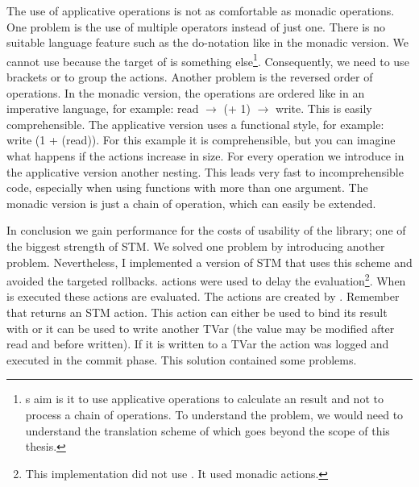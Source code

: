 The use of applicative operations is not as comfortable as monadic operations. One problem is the use of 
multiple operators instead of just one. There is no suitable language feature such as the do-notation like 
in the monadic version. We cannot use  because the target
of  is something else\footnote{s aim is it to use applicative 
operations to calculate an result and not to process a chain of operations. To understand the problem,
we would need to understand the translation scheme of  which goes beyond the scope of
this thesis.}. Consequently, we need to use brackets or \code{\$} to group the actions. Another problem is  
the reversed order of operations. In the monadic version, the operations are ordered like in an imperative
language, for example: read $\rightarrow$ (+ 1) $\rightarrow$ write. This is easily comprehensible. The 
applicative version uses a functional style, for example: write (1 + (read)). For this example it is 
comprehensible, but you can imagine what happens if the actions increase in size. For every operation
we introduce in the applicative version another nesting. This leads very fast to incomprehensible code,
especially when using functions with more than one argument. The monadic version is just a chain of operation, 
which can easily be extended. 

In conclusion we gain performance for the costs of usability of the library; one of the biggest strength of
STM. We solved one problem by introducing another problem. Nevertheless, I implemented a version of STM
that uses this scheme and avoided the targeted rollbacks.  actions were used
to delay the evaluation\footnote{This implementation did not use . It used monadic  actions.}. 
When \code{>>=} is executed these  actions are evaluated. The  actions are created by .
Remember that  returns an STM action. This action can either be used to bind its result with \code{>>=} or it 
can be used to write another TVar (the value may be modified after read and before written). If it is written to a 
TVar the  action was logged and executed in the commit phase. This solution contained some problems.

